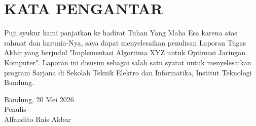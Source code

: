 \chapter*{KATA PENGANTAR}

Puji syukur kami panjatkan ke hadirat Tuhan Yang Maha Esa karena atas rahmat dan karunia-Nya, saya dapat menyelesaikan penulisan Laporan Tugas Akhir yang berjudul "Implementasi Algoritma XYZ untuk Optimasi Jaringan Komputer". Laporan ini disusun sebagai salah satu syarat untuk menyelesaikan program Sarjana di Sekolah Teknik Elektro dan Informatika, Institut Teknologi Bandung.
\begin{flushright}
    Bandung, 20 Mei 2026\\
    
    Penulis \\
    \vspace{1cm}
    Alfandito Rais Akbar
\end{flushright}
